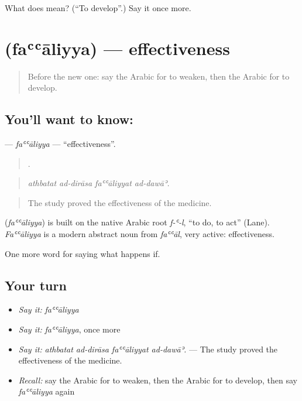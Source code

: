 \begin{tcolorbox}[breakable,colback=teal!4,colframe=teal!35!black,title={Before you move on}]
What does  mean? (\textquotedblleft{}To develop\textquotedblright{}.) Say it once more.
\end{tcolorbox}
\section[\texorpdfstring{\ar{فعالية} (faʿʿāliyya)}{فعالية (faʿʿāliyya)}]{ (faʿʿāliyya) — effectiveness}

\label{lesson:AR-C418-faaliyya}



\begin{quote}
Before the new one: say the Arabic for to weaken, then the Arabic for to develop.
\end{quote}

\subsection*{You'll want to know: }
\textbf{} — \emph{faʿʿāliyya} — \textquotedblleft{}effectiveness\textquotedblright{}.

\begin{quote}
   .
\end{quote}

\begin{quote}
\emph{athbatat ad-dirāsa faʿʿāliyyat ad-dawāʾ.}
\end{quote}

\begin{quote}
The study proved the effectiveness of the medicine.
\end{quote}

\begin{cousinweb}
\textbf{} (\emph{faʿʿāliyya}) is built on the native Arabic root \emph{f-ʿ-l}, \textquotedblleft{}to do, to act\textquotedblright{} (Lane). \emph{Faʿʿāliyya} is a modern abstract noun from \emph{faʿʿāl}, very active: effectiveness.
\end{cousinweb}

\begin{grammarlens}[title={What you've built}]
One more word for saying what happens if.
\end{grammarlens}

\subsection*{Your turn}
\begin{itemize}
\raggedright
  \item \emph{Say it:} \emph{faʿʿāliyya}
  \item \emph{Say it:} \emph{faʿʿāliyya}, once more
  \item \emph{Say it:} \emph{athbatat ad-dirāsa faʿʿāliyyat ad-dawāʾ.} — The study proved the effectiveness of the medicine.
  \item \emph{Recall:} say the Arabic for to weaken, then the Arabic for to develop, then say \emph{faʿʿāliyya} again
\end{itemize}

